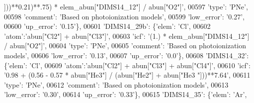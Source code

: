 \begin{DoxyCode}
{      ]))**0.21)**.75) * elem\_abun["DIMS14\_12"] / abun["O2"]'},
00597                                        \textcolor{stringliteral}{'type'}: \textcolor{stringliteral}{'PNe'},
00598                                        \textcolor{stringliteral}{'comment'}: \textcolor{stringliteral}{'Based on photoionization models'},
00599                                        \textcolor{stringliteral}{'low\_error'}: \textcolor{stringliteral}{'0.27'},
00600                                        \textcolor{stringliteral}{'up\_error'}: \textcolor{stringliteral}{'0.15'}\},
00601                          \textcolor{stringliteral}{'DIMS14\_29b'}: \{\textcolor{stringliteral}{'elem'}: \textcolor{stringliteral}{'Cl'},
00602                                        \textcolor{stringliteral}{'atom'}:\textcolor{stringliteral}{'abun["Cl2"] + abun["Cl3"]'}, 
00603                                        \textcolor{stringliteral}{'icf'}: \textcolor{stringliteral}{'(1.) * elem\_abun["DIMS14\_12"] / abun["O2"]'},
00604                                        \textcolor{stringliteral}{'type'}: \textcolor{stringliteral}{'PNe'},
00605                                        \textcolor{stringliteral}{'comment'}: \textcolor{stringliteral}{'Based on photoionization models'},
00606                                        \textcolor{stringliteral}{'low\_error'}: \textcolor{stringliteral}{'0.13'},
00607                                        \textcolor{stringliteral}{'up\_error'}: \textcolor{stringliteral}{'0.0'}\},
00608                          \textcolor{stringliteral}{'DIMS14\_32'}: \{\textcolor{stringliteral}{'elem'}: \textcolor{stringliteral}{'Cl'},
00609                                        \textcolor{stringliteral}{'atom'}:\textcolor{stringliteral}{'abun["Cl2"] + abun["Cl3"] + abun["Cl4"]'}, 
00610                                        \textcolor{stringliteral}{'icf'}: \textcolor{stringliteral}{'0.98 + (0.56 - 0.57 * abun["He3"] / (abun["He2"] + abun["He3
      "]))**7.64'},
00611                                        \textcolor{stringliteral}{'type'}: \textcolor{stringliteral}{'PNe'},
00612                                        \textcolor{stringliteral}{'comment'}: \textcolor{stringliteral}{'Based on photoionization models'},
00613                                        \textcolor{stringliteral}{'low\_error'}: \textcolor{stringliteral}{'0.30'},
00614                                        \textcolor{stringliteral}{'up\_error'}: \textcolor{stringliteral}{'0.33'}\},
00615                          \textcolor{stringliteral}{'DIMS14\_35'}: \{\textcolor{stringliteral}{'elem'}: \textcolor{stringliteral}{'Ar'},

\end{DoxyCode}
